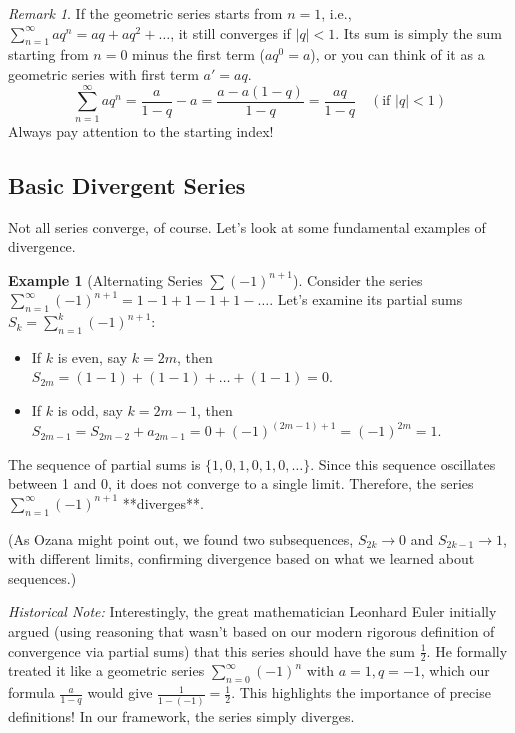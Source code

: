 \documentclass[11pt]{article}
\theoremstyle{definition}
\newtheorem{example}[theorem]{Example}
\theoremstyle{remark}
\newtheorem{remark}[theorem]{Remark}
\begin{document}
\begin{remark}
If the geometric series starts from $n=1$, i.e., $\sum_{n=1}^{\infty} a q^n = aq + aq^2 + \dots$, it still converges if $|q|<1$. Its sum is simply the sum starting from $n=0$ minus the first term ($a q^0 = a$), or you can think of it as a geometric series with first term $a' = aq$.
\[ \sum_{n=1}^{\infty} a q^n = \frac{a}{1-q} - a = \frac{a - a(1-q)}{1-q} = \frac{aq}{1-q} \quad (\text{if } |q|<1) \]
Always pay attention to the starting index!
\end{remark}


\subsection{Basic Divergent Series}

Not all series converge, of course. Let's look at some fundamental examples of divergence.

\begin{example}[Alternating Series $\sum (-1)^{n+1}$] \label{ex:alternating_one}
Consider the series $\sum_{n=1}^{\infty} (-1)^{n+1} = 1 - 1 + 1 - 1 + 1 - \dots$.
Let's examine its partial sums $S_k = \sum_{n=1}^{k} (-1)^{n+1}$:
\begin{itemize}
    \item If $k$ is even, say $k=2m$, then $S_{2m} = (1-1) + (1-1) + \dots + (1-1) = 0$.
    \item If $k$ is odd, say $k=2m-1$, then $S_{2m-1} = S_{2m-2} + a_{2m-1} = 0 + (-1)^{(2m-1)+1} = (-1)^{2m} = 1$.
\end{itemize}
The sequence of partial sums is $\{1, 0, 1, 0, 1, 0, \dots\}$. Since this sequence oscillates between 1 and 0, it does not converge to a single limit. Therefore, the series $\sum_{n=1}^{\infty} (-1)^{n+1}$ **diverges**.

(As Ozana might point out, we found two subsequences, $S_{2k} \to 0$ and $S_{2k-1} \to 1$, with different limits, confirming divergence based on what we learned about sequences.)

\textit{Historical Note:} Interestingly, the great mathematician Leonhard Euler initially argued (using reasoning that wasn't based on our modern rigorous definition of convergence via partial sums) that this series should have the sum $\frac{1}{2}$. He formally treated it like a geometric series $\sum_{n=0}^\infty (-1)^n$ with $a=1, q=-1$, which our formula $\frac{a}{1-q}$ would give $\frac{1}{1-(-1)} = \frac{1}{2}$. This highlights the importance of precise definitions! In our framework, the series simply diverges.
\end{example}
\end{document}

